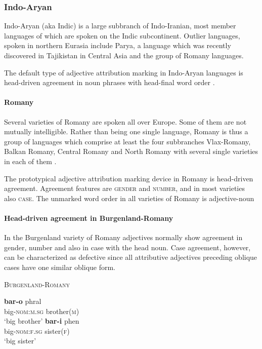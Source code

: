 \subsubsection{Indo-Aryan}
Indo-Aryan (aka Indic) is a large subbranch of Indo-Iranian, most member languages of which are spoken on the Indic subcontinent. Outlier languages, spoken in northern Eurasia include Parya, a language which was recently discovered in Tajikistan in Central Asia \cite[22]{masica1991} and the group of Romany languages. 

The default type of adjective attribution marking in Indo-Aryan languages is head-driven agreement in noun phrases with head-final word order \cite[369]{masica1991}.

\paragraph{Romany}
Several varieties of Romany are spoken all over Europe. Some of them are not mutually intelligible. Rather than being one single language, Romany is thus a group of languages which comprise at least the four subbranches Vlax-Romany, Balkan Romany, Central Romany and North Romany with several single varieties in each of them \citep[2–3]{halwachs-etal2002}.

The prototypical adjective attribution marking device in Romany is head-driven agreement. Agreement features are \textsc{gender} and \textsc{number}, and in most varieties also \textsc{case}. The unmarked word order in all varieties of Romany is adjective-noun %

\paragraph{Head-driven agreement in Burgenland-Romany}
In the Burgenland variety of Romany adjectives normally show agreement in gender, number and also in case with the head noun. Case agreement, however, can be characterized as defective since all attributive adjectives preceding oblique cases have one similar oblique form.
\begin{exe}
\ex \textsc{Burgenland-Romany} \cite[22–23]{halwachs-etal2002}
\begin{xlist} 
\ex 
\gll	\textbf{bar-o} phral\\
	big-\textsc{nom:m.sg} brother(\textsc{m})\\
\glt	‘big brother’
\ex
\gll	\textbf{bar-i} phen\\
	big-\textsc{nom:f.sg} sister(\textsc{f})\\
\glt	‘big sister’
\end{xlist}
\end{exe}

